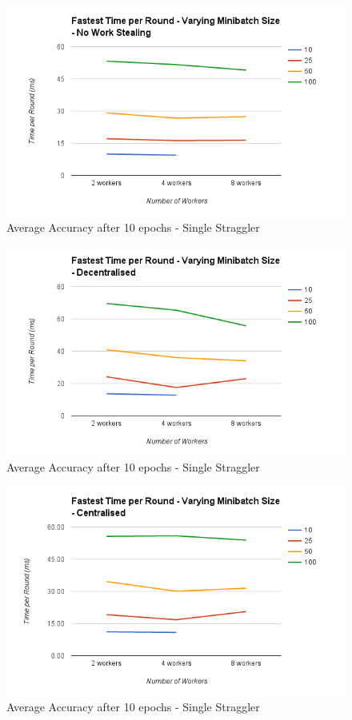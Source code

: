 \documentclass[12pt]{article}
\begin{document}
\begin{figure}[H]
  \centering
  \includegraphics[width=6in]{FastestMinibatchNo}
  \caption[]{Average Accuracy after 10 epochs - Single Straggler}
  \label{FastestMinibatchNo}
\end{figure}

\begin{figure}[H]
  \centering
  \includegraphics[width=6in]{FastestMinibatchDecentralised}
  \caption[]{Average Accuracy after 10 epochs - Single Straggler}
  \label{FastestMinibatchDecentralised}
\end{figure}

\begin{figure}[H]
  \centering
  \includegraphics[width=6in]{FastestMinibatchCentralised}
  \caption[]{Average Accuracy after 10 epochs - Single Straggler}
  \label{FastestMinibatchCentralised}
\end{figure}
\end{document}
